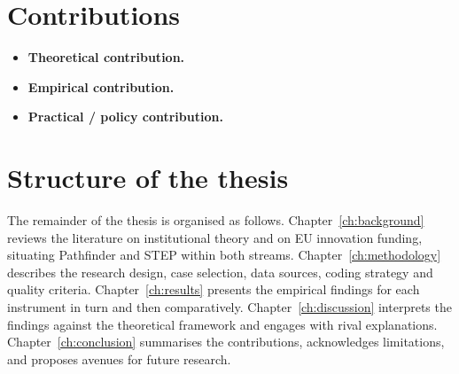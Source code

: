 \section{Contributions}
\label{sec:intro-contribution}
\begin{itemize}
    \item \textbf{Theoretical contribution.} 
    \item \textbf{Empirical contribution.} 
    \item \textbf{Practical / policy contribution.} 
\end{itemize}

\section{Structure of the thesis}
\label{sec:intro-structure}
The remainder of the thesis is organised as follows.
Chapter~\ref{ch:background} reviews the literature on institutional theory
and on EU innovation funding, situating Pathfinder and STEP within both
streams.
Chapter~\ref{ch:methodology} describes the research design, case selection,
data sources, coding strategy and quality criteria.
Chapter~\ref{ch:results} presents the empirical findings for each instrument
in turn and then comparatively.
Chapter~\ref{ch:discussion} interprets the findings against the theoretical
framework and engages with rival explanations.
Chapter~\ref{ch:conclusion} summarises the contributions, acknowledges
limitations, and proposes avenues for future research.
